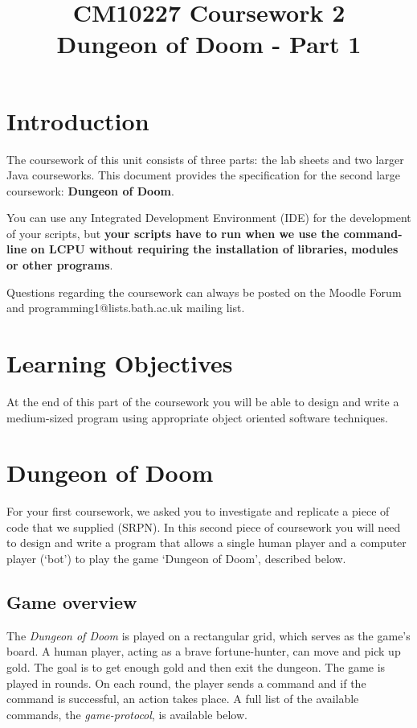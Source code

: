\documentclass{article}
\title{CM10227 Coursework 2\\ Dungeon of Doom - Part 1}
\begin{document}
\maketitle

\section{Introduction}
The coursework of this unit consists of three parts: the lab sheets and two larger Java courseworks. This document provides the specification for the second large coursework: \textbf{Dungeon of Doom}.

You can use any Integrated Development Environment (IDE) for the development of your scripts, but \textbf{your scripts have to run when we use the command-line on LCPU  without requiring the installation of libraries, modules or other programs}.

Questions regarding the coursework can always be posted on the Moodle Forum and programming1@lists.bath.ac.uk mailing list.

\section{Learning Objectives}
At the end of this part of the coursework you will be able to design and write a medium-sized program using  appropriate object oriented software techniques.

\section{Dungeon of Doom}
For your first coursework, we asked you to investigate and replicate a piece of code that we 
supplied (SRPN). In this second piece of coursework you will need to design and write a program that allows a single human player and a computer player (`bot') to play the game `Dungeon of Doom', described below. 

\subsection{Game overview}

The \textit{Dungeon of Doom} is played on a rectangular grid, which serves as the game's board. A human player, acting as a brave fortune-hunter, can move and pick up gold. The goal is to get enough gold and then exit the dungeon. The game is played in rounds. On each round, the player sends a command and if the command is successful, an action takes place. A full list of the available commands, the \textit{game-protocol}, is available below. 
\end{document}
